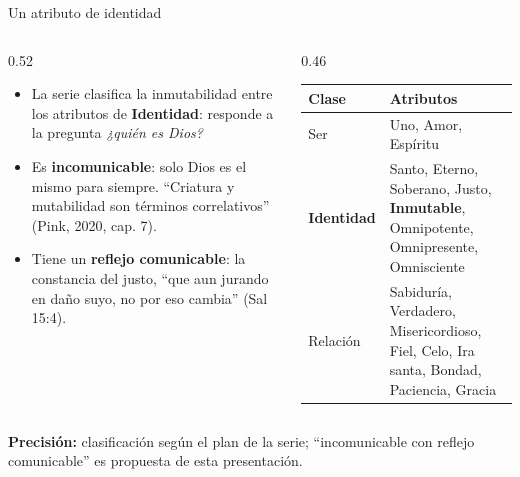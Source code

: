 \documentclass[hyperref={bookmarks=false},aspectratio=169]{beamer}
\newcommand{\destacar}[1]{\textbf{\textcolor{azul}{#1}}}
\newcommand{\precision}[1]{{\footnotesize\color{gris}\textbf{Precisión:} #1}}
\begin{document}
\begin{frame}{Un atributo de identidad}
\begin{columns}[c,onlytextwidth]
\begin{column}{0.52\textwidth}\small
\begin{itemize}
\item La serie clasifica la inmutabilidad entre los atributos de \destacar{Identidad}: responde a la pregunta \emph{¿quién es Dios?}
\item Es \destacar{incomunicable}: solo Dios es el mismo para siempre. ``Criatura y mutabilidad son términos correlativos'' (Pink, 2020, cap. 7).
\item Tiene un \destacar{reflejo comunicable}: la constancia del justo, ``que aun jurando en daño suyo, no por eso cambia'' (Sal 15:4).
\end{itemize}
\end{column}
\begin{column}{0.46\textwidth}
\scriptsize\renewcommand{\arraystretch}{1.2}
\begin{tabular}{@{}>{\RaggedRight\arraybackslash}p{1.9cm}>{\RaggedRight\arraybackslash}p{3.6cm}@{}}
\toprule
\textbf{Clase} & \textbf{Atributos} \\ \midrule
Ser & Uno, Amor, Espíritu \\
\destacar{Identidad} & Santo, Eterno, Soberano, Justo, \destacar{Inmutable}, Omnipotente, Omnipresente, Omnisciente \\
Relación & Sabiduría, Verdadero, Misericordioso, Fiel, Celo, Ira santa, Bondad, Paciencia, Gracia \\
\bottomrule
\end{tabular}
\end{column}
\end{columns}\par\smallskip
\precision{clasificación según el plan de la serie; ``incomunicable con reflejo comunicable'' es propuesta de esta presentación.}
\end{frame}
\end{document}

